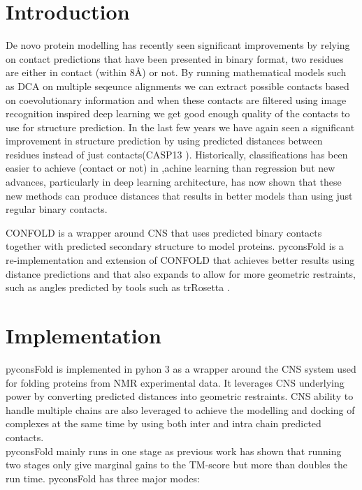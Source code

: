 \documentclass{bioinfo}
\begin{document}
\section{Introduction}
De novo protein modelling has recently seen significant improvements by relying on contact predictions that have been presented in binary format, two residues are either in contact (within 8Å) or not. By running mathematical models such as DCA on multiple seqeunce alignments we can extract possible contacts based on coevolutionary information and when these contacts are filtered using image recognition inspired deep learning we get good enough quality of the contacts to use for structure prediction. In the last few years we have again seen a significant improvement in structure prediction by using predicted distances between residues instead of just contacts(CASP13 \cite{Kryshtafovych2019-zb,Yang1496}). Historically, classifications has been easier to achieve (contact or not) in ,achine learning than regression but new advances, particularly in deep learning architecture, has now shown that these new methods can produce distances that results in better models than using just regular binary contacts.

CONFOLD\cite{Adhikari2015-fl} is a wrapper around CNS \cite{Brunger1998-ji,Brunger2007-ut} that uses predicted binary contacts together with predicted secondary structure to model proteins. pyconsFold is a re-implementation and extension of CONFOLD that achieves better results using distance predictions and that also expands to allow for more geometric restraints, such as angles predicted by tools such as trRosetta \cite{Yang1496}.

\section{Implementation}
pyconsFold is implemented in pyhon 3 as a wrapper around the CNS system used for folding proteins from NMR experimental data. It leverages CNS underlying power by converting predicted distances into geometric restraints. CNS ability to handle multiple chains are also leveraged to achieve the modelling and docking of complexes at the same time by using both inter and intra chain predicted contacts.\\
pyconsFold mainly runs in one stage as previous work \cite{Michel2017} has shown that running two stages only give marginal gains to the TM-score but more than doubles the run time.
pyconsFold has three major modes:
\end{document}
